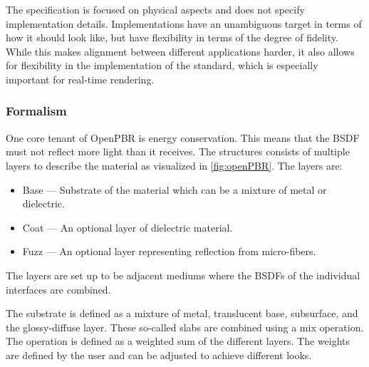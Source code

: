 The specification is focused on physical aspects and does not specify implementation details. Implementations have an unambiguous target in terms of how it should look like, but have flexibility in terms of the degree of fidelity. While this makes alignment between different applications harder, it also allows for flexibility in the implementation of the standard, which is especially important for real-time rendering.

\subsubsection{Formalism}

One core tenant of \gls{OpenPBR} is energy conservation. This means that the \gls{BSDF} must not reflect more light than it receives. The structures consists of multiple layers to describe the material as visualized in \autoref{fig:openPBR}. The layers are:

\begin{itemize}
  \item{Base} — Substrate of the material which can be a mixture of metal or dielectric.
  \item{Coat} — An optional layer of dielectric material.
  \item{Fuzz} — An optional layer representing reflection from micro-fibers.
\end{itemize}

The layers are set up to be adjacent mediums where the \glspl{BSDF} of the individual interfaces are combined.

The substrate is defined as a mixture of metal, translucent base, subsurface, and the glossy-diffuse layer. These so-called slabs are combined using a mix operation. The operation is defined as a weighted sum of the different layers. The weights are defined by the user and can be adjusted to achieve different looks.

